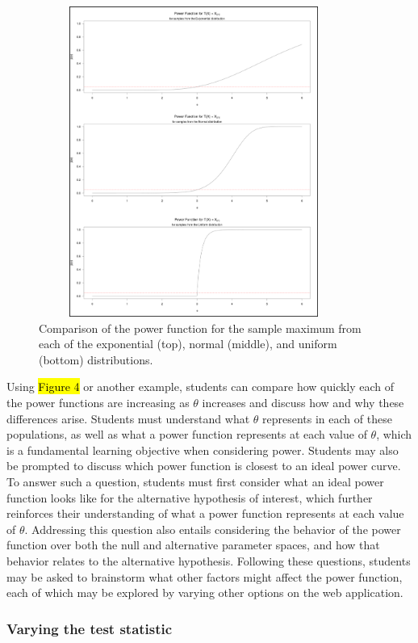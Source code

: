 \documentclass{TISE}
\begin{document}
\begin{figure}[H]
	\centering
	\includegraphics[height=4in,width=4in]{varypop.png}
	\caption{Comparison of the power function for the sample maximum from each of the exponential (top), normal (middle), and uniform (bottom) distributions.}
\end{figure}

Using \hl{Figure 4} or another example, students can compare how quickly each of the power functions are increasing as $\theta$ increases and discuss how and why these differences arise. Students must understand what $\theta$ represents in each of these populations, as well as what a power function represents at each value of $\theta$, which is a fundamental learning objective when considering power. Students may also be prompted to discuss which power function is closest to an ideal power curve. To answer such a question, students must first consider what an ideal power function looks like for the alternative hypothesis of interest, which further reinforces their understanding of what a power function represents at each value of $\theta$. Addressing this question also entails considering the behavior of the power function over both the null and alternative parameter spaces, and how that behavior relates to the alternative hypothesis. Following these questions, students may be asked to brainstorm what other factors might affect the power function, each of which may be explored by varying other options on the web application.

\subsubsection{Varying the test statistic}
\end{document}
